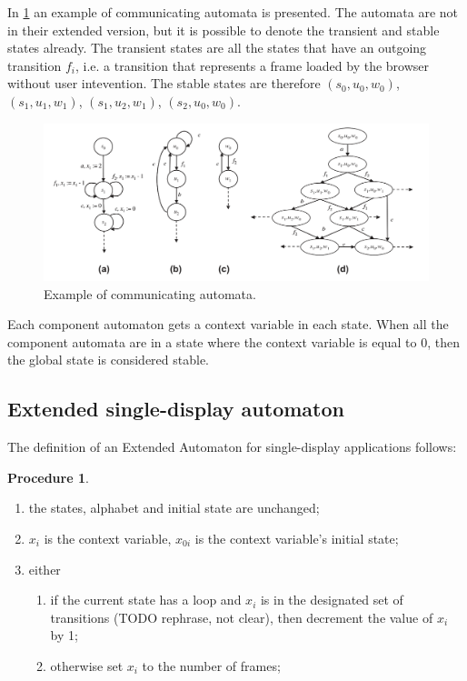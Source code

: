 \documentclass[a4paper,10pt]{article}
\theoremstyle{plain} %
\theoremstyle{definition}
\newtheorem{procedure}{Procedure}
\theoremstyle{remark}
\begin{document}
In \cref{fig:example-communicating-automata} an example of communicating automata is presented. The automata are not in their extended version, but it is possible to denote the transient and stable states already. The transient states are all the states that have an outgoing transition $f_i$, i.e. a transition that represents a frame loaded by the browser without user intevention. The stable states are therefore $(s_0,u_0,w_0)$, $(s_1,u_1,w_1)$, $(s_1,u_2,w_1)$, $(s_2,u_0,w_0)$.

\begin{figure}[h]
  \includegraphics[width=\textwidth]{img/communicating_automata_example.png}
  \caption{Example of communicating automata.}
  \label{fig:example-communicating-automata}
\end{figure}

Each component automaton gets a context variable in each state. When all the component automata are in a state where the context variable is equal to 0, then the global state is considered stable.

\subsection{Extended single-display automaton}

The definition of an Extended Automaton for single-display applications follows:

\begin{procedure}
  \label{extended-single-automaton}
  \begin{enumerate}
    \item the states, alphabet and initial state are unchanged;
    \item $x_i$ is the context variable, $x_{0i}$ is the context variable's initial state;
    \item either
      \begin{enumerate}
        \item if the current state has a loop and $x_i$ is in the designated set of transitions (TODO rephrase, not clear), then decrement the value of $x_i$ by 1;
        \item otherwise set $x_i$ to the number of frames;
      \end{enumerate}
  \end{enumerate}
\end{procedure}
\end{document}
